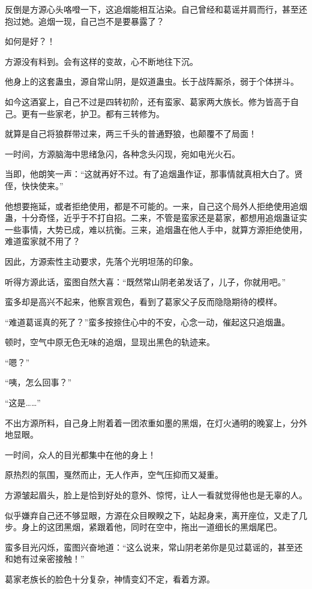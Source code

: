 \begin{this_body}
反倒是方源心头咯噔一下，这追烟能相互沾染。自己曾经和葛谣并肩而行，甚至还抱过她。追烟一现，自己岂不是要暴露了？

如何是好？！

方源没有料到。会有这样的变故，心不断地往下沉。

他身上的这套蛊虫，源自常山阴，是奴道蛊虫。长于战阵厮杀，弱于个体拼斗。

如今这酒宴上，自己不过是四转初阶，还有蛮家、葛家两大族长。修为皆高于自己。更有一些家老，护卫。都有三转修为。

就算是自己将狼群带过来，两三千头的普通野狼，也颠覆不了局面！

一时间，方源脑海中思绪急闪，各种念头闪现，宛如电光火石。

当即，他朗笑一声：“这就再好不过。有了追烟蛊作证，那事情就真相大白了。贤侄，快快使来。”

他想要拖延，或者拒绝使用，都是不可能的。一来，自己这个局外人拒绝使用追烟蛊，十分奇怪，近乎于不打自招。二来，不管是蛮家还是葛家，都想用追烟蛊证实一些事情，大势已成，难以抗衡。三来，追烟蛊在他人手中，就算方源拒绝使用，难道蛮家就不用了？

因此，方源索性主动要求，先落个光明坦荡的印象。

听得方源此话，蛮图自然大喜：“既然常山阴老弟发话了，儿子，你就用吧。”

蛮多却是高兴不起来，他察言观色，看到了葛家父子反而隐隐期待的模样。

“难道葛谣真的死了？”蛮多按捺住心中的不安，心念一动，催起这只追烟蛊。

顿时，空气中原无色无味的追烟，显现出黑色的轨迹来。

“嗯？”

“咦，怎么回事？”

“这是……”

不出方源所料，自己身上附着着一团浓重如墨的黑烟，在灯火通明的晚宴上，分外地显眼。

一时间，众人的目光都集中在他的身上！

原热烈的氛围，戛然而止，无人作声，空气压抑而又凝重。

方源皱起眉头，脸上是恰到好处的意外、惊愕，让人一看就觉得他也是无辜的人。

似乎嫌弃自己还不够显眼，方源在众目睽睽之下，站起身来，离开座位，又走了几步。身上的这团黑烟，紧跟着他，同时在空中，拖出一道细长的黑烟尾巴。

蛮多目光闪烁，蛮图兴奋地道：“这么说来，常山阴老弟你是见过葛谣的，甚至还和她有过亲密接触！”

葛家老族长的脸色十分复杂，神情变幻不定，看着方源。


\end{this_body}
